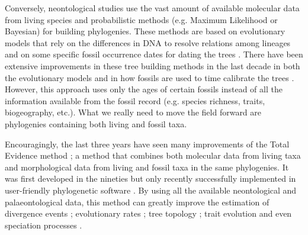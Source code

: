 Conversely, neontological studies use the vast amount of available molecular data from living species and probabilistic methods (e.g. Maximum Likelihood or Bayesian) for building phylogenies.
These methods are based on evolutionary models that rely on the differences in DNA to resolve relations among lineages and on some specific fossil occurrence dates for dating the trees \citep[i.e. the molecular clock;][]{zuckerkandl1965}.
There have been extensive improvements in these tree building methods in the last decade in both the evolutionary models \citep[e.g.][]{bapsta2013,stadlerdating2013,heaththe2013} and in how fossils are used to time calibrate the trees \citep{Donoghue2007424,Parham01032012}.
However, this approach uses only the ages of certain fossils instead of all the information available from the fossil record (e.g. species richness, traits, biogeography, etc.).
What we really need to move the field forward are phylogenies containing both living and fossil taxa.

Encouragingly, the last three years have seen many improvements of the Total Evidence method \citep{ronquista2012,slaterphylogenetic2013,Wood01032013,schragocombining2013,beckancient2014,Arcila2015131,Dembo2015}; a method that combines both molecular data from living taxa and morphological data from living and fossil taxa in the same phylogenies.
It was first developed in the nineties \citep{eernissetaxonomic1993} but only recently successfully implemented in user-friendly phylogenetic software \citep{Ronquist2012mrbayes,BEAST2}.
By using all the available neontological and palaeontological data, this method can greatly improve the estimation of divergence events \citep[e.g.][]{ronquista2012}; evolutionary rates \citep[e.g.][]{beckancient2014}; tree topology \citep[e.g.][]{Dembo2015}; trait evolution \citep[e.g.][]{slaterphylogenetic2013} and even speciation processes \citep[e.g.][]{Wood01032013}.


